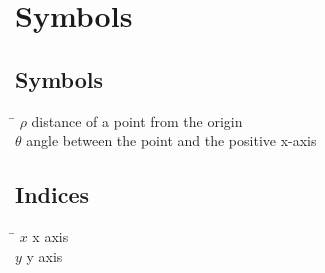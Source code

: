 \chapter*{Symbols}
\label{sec:symbols}

\section*{Symbols}

\begin{tabbing}
 \hspace*{1.6cm} \= \kill
  $\rho$ \> distance of a point from the origin \\[0.5ex] 
  $\theta$  \>  angle between the point and the positive x-axis  					
\end{tabbing}

\section*{Indices}
\begin{tabbing}
 \hspace*{1.6cm}  \= \kill
 $x$ \> x axis \\[0.5ex]
 $y$ \> y axis \\[0.5ex]
\end{tabbing}

